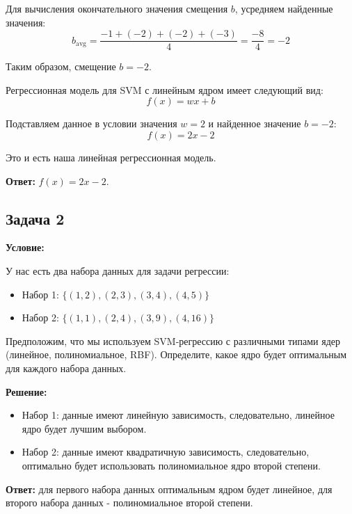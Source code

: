 \par Для вычисления окончательного значения смещения \(b\), усредняем найденные значения:
\begin{equation*}
    b_{\text{avg}} = \frac{-1 + (-2) + (-2) + (-3)}{4} = \frac{-8}{4} = -2
\end{equation*}
\par Таким образом, смещение \(b = -2\).
\par Регрессионная модель для SVM с линейным ядром имеет следующий вид:
\begin{equation*}
    f(x) = w x + b
\end{equation*}
\par Подставляем данное в условии значения \(w = 2\) и найденное значение \(b = -2\):
\begin{equation*}
    f(x) = 2x - 2
\end{equation*}
\par Это и есть наша линейная регрессионная модель.
\par \noindent \textbf{Ответ:} \(f(x) = 2x - 2\).

\subsection{Задача 2}
\textbf{Условие:}
\par У нас есть два набора данных для задачи регрессии:
\begin{itemize}
    \item Набор 1: \( \{(1, 2), (2, 3), (3, 4), (4, 5)\} \)
    \item Набор 2: \( \{(1, 1), (2, 4), (3, 9), (4, 16)\} \)
\end{itemize}
\par Предположим, что мы используем SVM-регрессию с различными типами ядер (линейное, полиномиальное, RBF). Определите, какое ядро будет оптимальным для каждого набора данных.
\par \noindent \textbf{Решение:}
\begin{itemize}
    \item Набор 1: данные имеют линейную зависимость, следовательно, линейное ядро будет лучшим выбором.

    \item Набор 2: данные имеют квадратичную зависимость, следовательно, оптимально будет использовать полиномиальное ядро второй степени.
\end{itemize}
\par \noindent \textbf{Ответ:} для первого набора данных оптимальным ядром будет линейное, для второго набора данных - полиномиальное второй степени.

